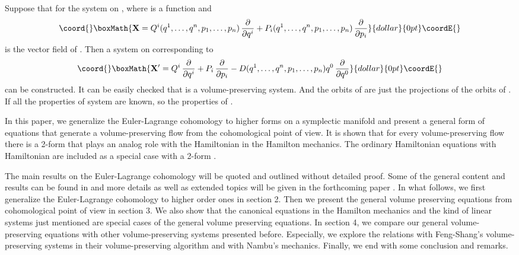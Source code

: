 \documentclass[12pt,a4paper]{article}
\providecommand{\vect}{\mathbf}
\providecommand{\Lied}[1]{\mathcal{L}_{\vect{#1}}}
\begin{document}
Suppose that for the system \coordHE{} on \coordHE{},
\myHighlight{$\Lied{X}(\omega^n) = D\, \omega^n$}\coordHE{} where \coordHE{} is a
function and
$$\coord{}\boxMath{\vect{X} = Q^i(q^1,\ldots,q^n,p_1,\ldots,p_n)\,
  \frac{\partial}{\partial q^i}
 + P_i(q^1,\ldots,q^n,p_1,\ldots,p_n)\,
 \frac{\partial}{\partial p_i}}{dollar}{0pt}\coordE{}$$
is the vector field of \coordHE{}. Then a system \coordHE{} on
\coordHE{} corresponding to
$$\coord{}\boxMath{\vect{X}' = Q^i\,\frac{\partial}{\partial q^i}
  + P_i\,\frac{\partial}{\partial p_i}
  - D(q^1,\ldots,q^n,p_1,\ldots,p_n)q^0 \,
  \frac{\partial}{\partial q^0}}{dollar}{0pt}\coordE{}$$
can be constructed. It can be easily checked that \coordHE{} is a
volume-preserving system. And the orbits of \coordHE{} are just the
projections of the orbits of \coordHE{}. If all the properties of system
\coordHE{} are known, so the properties of \coordHE{}.



In this paper, we generalize the Euler-Lagrange cohomology to
higher forms on a symplectic manifold \coordHE{} and
present a general form of equations that generate a
volume-preserving flow  from the cohomological point of view. It
is shown that for every volume-preserving flow there is a 2-form
that plays an analog role with the Hamiltonian  in the Hamilton
mechanics. The ordinary Hamiltonian equations with Hamiltonian \coordHE{}
are included as a special case with a 2-form
\coordHE{}.

The main results on the Euler-Lagrange cohomology will be quoted
and outlined without detailed proof. Some of the general content
and results can be found in \cite{gpwz1}
 and more details as well as extended topics will be given in
the forthcoming paper \cite{gpwz2}. In what follows, we first
generalize the Euler-Lagrange cohomology to higher order ones in
section 2. Then we present the general volume preserving equations
from cohomological point of view in section 3. We also show that
the canonical equations in the Hamilton mechanics and the kind of
linear systems just mentioned are special cases of the general
volume preserving equations. In section 4, we compare our general
volume-preserving equations with other volume-preserving systems
presented before. Especially, we explore the relations with
Feng-Shang's volume-preserving systems in their volume-preserving
algorithm\cite{FS} and with Nambu's mechanics\cite{Nambu}.
Finally, we end with some conclusion and remarks.
\end{document}
